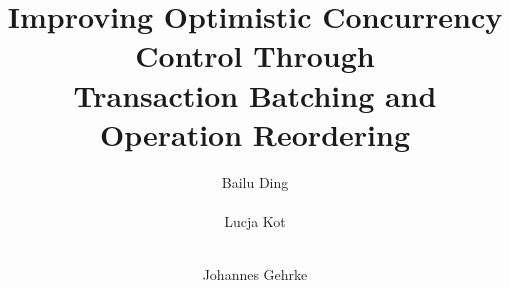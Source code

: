\documentclass[sigconf]{acmart}
\begin{document}

\title{Improving Optimistic Concurrency Control Through \\
	Transaction Batching and Operation Reordering}



%
%
%
%


\author{
%
%
\alignauthor Bailu Ding \\
    \\
\alignauthor Lucja Kot \\
	\\
\and
\alignauthor Johannes Gehrke\\
	\\
}

\maketitle





%
%








\clearpage
\appendix


\end{document}
